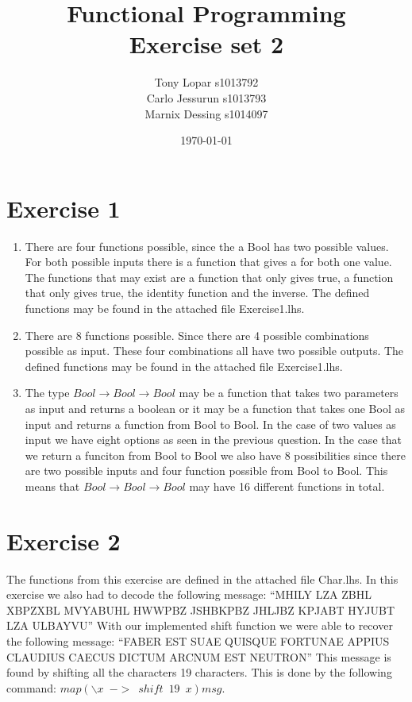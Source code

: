 \documentclass{article}
\begin{document}
\title{Functional Programming \\ Exercise set 2}
\date{\today}
\author{Tony Lopar s1013792 \\ Carlo Jessurun s1013793 \\ Marnix Dessing s1014097}
\maketitle

\section*{Exercise 1}
\begin{enumerate}
  \item There are four functions possible, since the a Bool has two possible values. For both possible inputs there is a function that gives a for both one value. The functions that may exist are a function that only gives true, a function that only gives true, the identity function and the inverse. The defined functions may be found in the attached file Exercise1.lhs.
  \item There are 8 functions possible. Since there are 4 possible combinations possible as input. These four combinations all have two possible outputs. The defined functions may be found in the attached file Exercise1.lhs.
  \item The type $Bool \rightarrow Bool \rightarrow Bool$ may be a function that takes two parameters as input and returns a boolean or it may be a function that takes one Bool as input and returns a function from Bool to Bool. In the case of two values as input we have eight options as seen in the previous question. In the case that we return a funciton from Bool to Bool we also have 8 possibilities since there are two possible inputs and four function possible from Bool to Bool. This means that $Bool \rightarrow Bool \rightarrow Bool$ may have 16 different functions in total.
\end{enumerate}
\newpage
\section*{Exercise 2}
The functions from this exercise are defined in the attached file Char.lhs. In this exercise we also had to decode the following message:
\newline
``MHILY LZA ZBHL XBPZXBL MVYABUHL HWWPBZ JSHBKPBZ JHLJBZ KPJABT HYJUBT LZA ULBAYVU''
\newline
With our implemented shift function we were able to recover the following message:
\newline
``FABER EST SUAE QUISQUE FORTUNAE APPIUS CLAUDIUS CAECUS DICTUM ARCNUM EST NEUTRON''
\newline
This message is found by shifting all the characters 19 characters. This is done by the following command:
$map (\backslash x \enspace -> \enspace shift \enspace 19 \enspace x)msg$.
\end{document}
